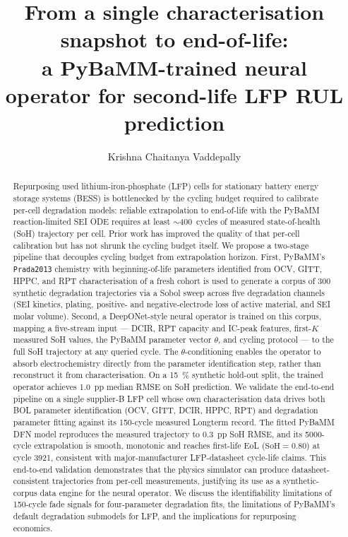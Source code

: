 \documentclass[preprint,12pt,3p,authoryear]{elsarticle}
\begin{document}
\begin{frontmatter}

\title{From a single characterisation snapshot to end-of-life:\\
a PyBaMM-trained neural operator for second-life LFP RUL prediction}

\author[turno]{Krishna Chaitanya Vaddepally}
\address[turno]{Turno (Blubble Pvt.\ Ltd.), Bengaluru, India}

\begin{abstract}
Repurposing used lithium-iron-phosphate (LFP) cells for stationary
battery energy storage systems (BESS) is bottlenecked by the cycling
budget required to calibrate per-cell degradation models: reliable
extrapolation to end-of-life with the PyBaMM reaction-limited SEI ODE
requires at least \(\sim\)\SI{400}{cycles} of measured state-of-health
(SoH) trajectory per cell. Prior work has improved the quality of that
per-cell calibration but has not shrunk the cycling budget itself. We
propose a two-stage pipeline that decouples cycling budget from
extrapolation horizon. First, PyBaMM's \texttt{Prada2013} chemistry
with beginning-of-life parameters identified from OCV, GITT, HPPC, and
RPT characterisation of a fresh cohort is used to generate a corpus of
\num{300} synthetic degradation trajectories via a Sobol sweep across
five degradation channels (SEI kinetics, plating, positive- and
negative-electrode loss of active material, and SEI molar volume).
Second, a DeepONet-style neural operator is trained on this corpus,
mapping a five-stream input --- DCIR, RPT capacity and IC-peak
features, first-\(K\) measured SoH values, the PyBaMM parameter vector
\(\theta\), and cycling protocol --- to the full SoH trajectory at any
queried cycle. The \(\theta\)-conditioning enables the operator to
absorb electrochemistry directly from the parameter identification
step, rather than reconstruct it from characterisation. On a
\qty{15}{\percent} synthetic hold-out split, the trained operator
achieves \SI{1.0}{pp} median RMSE on SoH prediction. We validate the end-to-end pipeline on a single supplier-B LFP cell
whose own characterisation data drives both BOL parameter
identification (OCV, GITT, DCIR, HPPC, RPT) and degradation parameter
fitting against its \num{150}-cycle measured Longterm record. The
fitted PyBaMM DFN model reproduces the measured trajectory to
\SI{0.3}{pp} SoH RMSE, and its 5000-cycle extrapolation is smooth,
monotonic and reaches first-life EoL
(\(\text{SoH}=0.80\)) at cycle \num{3921}, consistent with
major-manufacturer LFP-datasheet cycle-life claims. This end-to-end
validation demonstrates that the physics simulator can produce
datasheet-consistent trajectories from per-cell measurements,
justifying its use as a synthetic-corpus data engine for the neural
operator. We discuss the identifiability limitations of
\num{150}-cycle fade signals for four-parameter degradation fits,
the limitations of PyBaMM's default degradation submodels for LFP,
and the implications for repurposing economics.
\end{abstract}


\end{frontmatter}
\end{document}
